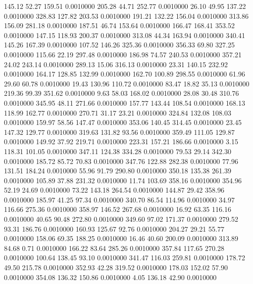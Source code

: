  145.12   52.27  159.51   0.0010000
 205.28   44.71  252.77   0.0010000
  26.10   49.95  137.22   0.0010000
 328.83  127.82  203.53   0.0010000
 191.21  132.22  156.04   0.0010000
 313.86  156.09  281.18   0.0010000
 187.51   46.74  153.64   0.0010000
 166.47  168.41  353.52   0.0010000
 147.15  118.93  200.37   0.0010000
 313.08   44.34  163.94   0.0010000
 340.41  145.26  167.39   0.0010000
 107.52  146.26  325.36   0.0010000
 356.33   69.80  327.25   0.0010000
 115.66   22.19  297.48   0.0010000
 186.98   74.57  240.53   0.0010000
 357.21   24.02  243.14   0.0010000
 289.13   15.06  316.13   0.0010000
  23.31  140.15  232.92   0.0010000
 164.17  128.85  132.99   0.0010000
 162.70  100.89  298.55   0.0010000
  61.96   29.60   60.78   0.0010000
  19.43  130.96  110.72   0.0010000
  83.47   18.82   35.13   0.0010000
 219.36   99.39  351.62   0.0010000
   9.63   58.03  168.02   0.0010000
  28.08   30.48  310.76   0.0010000
 345.95   48.11  271.66   0.0010000
 157.77  143.44  108.54   0.0010000
 168.13  118.99  162.77   0.0010000
 270.71   31.17   23.21   0.0010000
 324.84  132.08  108.03   0.0010000
 159.97   58.56  147.47   0.0010000
 353.06  140.45  314.45   0.0010000
  23.45  147.32  129.77   0.0010000
 319.63  131.82   93.56   0.0010000
 359.49  111.05  129.87   0.0010000
 149.92   37.92  219.71   0.0010000
 223.31  157.21  186.66   0.0010000
   3.15  118.31  101.05   0.0010000
 347.11  124.38  334.28   0.0010000
  79.53   29.14  342.30   0.0010000
 185.72   85.72   70.83   0.0010000
 347.76  122.88  282.38   0.0010000
  77.96  131.51  184.24   0.0010000
  55.96   91.79  290.80   0.0010000
 350.18  135.38  261.39   0.0010000
 105.89   37.88  231.32   0.0010000
  11.74  103.69  358.16   0.0010000
 354.96   52.19   24.69   0.0010000
  73.22  143.18  264.54   0.0010000
 144.87   29.42  358.96   0.0010000
 185.97   41.25   97.34   0.0010000
 340.70   86.54  114.96   0.0010000
  34.97  116.66  275.36   0.0010000
 358.97  146.52  267.68   0.0010000
  16.92   63.35  116.16   0.0010000
  40.65   90.48  272.80   0.0010000
 349.60   97.02  171.37   0.0010000
 279.52   93.31  186.76   0.0010000
 160.93  125.67   92.76   0.0010000
 204.27   29.21   55.77   0.0010000
 158.06   69.35  188.25   0.0010000
  16.46   40.60  200.09   0.0010000
 313.89   84.68    0.71   0.0010000
 166.22   83.64  285.26   0.0010000
 357.84  117.65  270.28   0.0010000
 100.64  138.45   93.10   0.0010000
 341.47  116.03  259.81   0.0010000
 178.72   49.50  215.78   0.0010000
 352.93   42.28  319.52   0.0010000
 178.03  152.02   57.90   0.0010000
 354.08  136.32  150.86   0.0010000
   4.05  136.18   42.90   0.0010000
